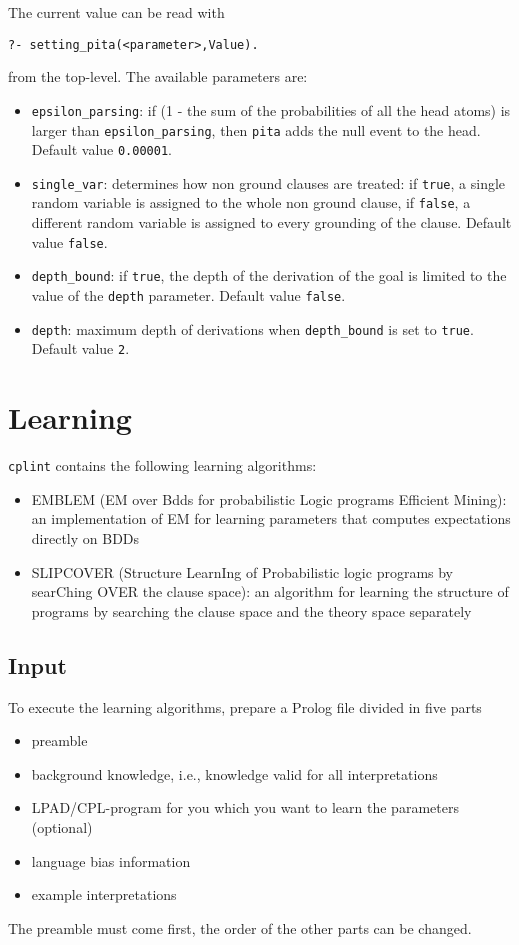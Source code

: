 \documentclass[a4paper,10pt]{article}
\begin{document}
The current value can be read with
\begin{verbatim}
?- setting_pita(<parameter>,Value).
\end{verbatim}
from the top-level.
The available parameters are:
\begin{itemize}
\item 
	 \verb|epsilon_parsing|: if (1 - the sum of the probabilities of all the head atoms) is larger than 
    \verb|epsilon_parsing|,
		then \texttt{pita} adds the null event to the head. Default value \texttt{0.00001}.
\item \verb|single_var|: determines how non ground clauses are treated: if \texttt{true}, a single random variable is assigned to the whole non ground clause, 
if \texttt{false}, a different random variable is assigned to every grounding of the clause. Default value \texttt{false}.
\item \verb|depth_bound|: if \texttt{true}, the depth of the derivation of the goal is limited to the value of the \texttt{depth} parameter.  Default value \texttt{false}.
\item  \texttt{depth}: maximum depth of derivations when  \verb|depth_bound| is set to \texttt{true}. Default value \texttt{2}.
\end{itemize}




\section{Learning}
\texttt{cplint} contains the following learning algorithms:
\begin{itemize}
\item EMBLEM (EM over Bdds for probabilistic Logic programs Efficient Mining): an implementation of EM for learning parameters that computes expectations directly on BDDs \cite{BelRig11-IDA,BelRig11-CILC11-NC,BelRig11-TR}
\item SLIPCOVER (Structure LearnIng of Probabilistic logic programs by searChing OVER the clause space): an algorithm for learning the structure of programs by searching the clause space and the theory space separately \cite{BelRig13-TPLP-IJ}
\end{itemize}

\subsection{Input}
To execute the learning algorithms, prepare a Prolog file divided in five parts
\begin{itemize}
\item preamble
\item  background knowledge, i.e., knowledge valid for all interpretations
\item  LPAD/CPL-program for you which you want to learn the parameters (optional)
\item language bias information
\item  example interpretations 
\end{itemize}
The preamble must come first, the order of the other parts can be changed.
\end{document}

